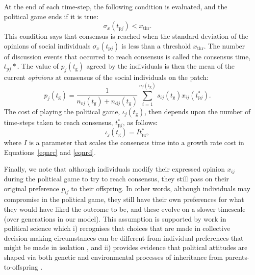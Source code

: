 \documentclass{rstb}
\begin{document}
\begin{linenumbers}
At the end of each time-step, the following condition is evaluated, and the political game ends if it is true:
\begin{equation}
    \sigma_x(t_{\mathrm{p}j}) < x_\mathrm{thr}.
    \label{eqnConsensus}
\end{equation}
This condition says that consensus is reached when the standard deviation of the opinions of social individuals $\sigma_x(t_{\mathrm{p}j})$ is less than a threshold $x_\mathrm{thr}$. The number of discussion events that occurred to reach consensus is called the consensus time, $t_{\mathrm{p}j}*$. The value of $p_j(t_\mathrm{g})$ agreed by the individuals is then the mean of the current \emph{opinions} at consensus of the social individuals on the patch:
\begin{equation}
    p_j(t_\mathrm{g}) = \frac{1}{n_{\mathrm{c}j}(t_\mathrm{g})+n_{\mathrm{d}j}(t_\mathrm{g})} \sum_{i=1}^{n_{j}(t_\mathrm{g})} s_{ij}(t_\mathrm{g})x_{ij}(t_{\mathrm{p}j}^*).
    \label{eqnFinalP}
\end{equation}
The cost of playing the political game, $\iota_j(t_\mathrm{g})$, then depends upon the number of time-steps taken to reach consensus, $t_{\mathrm{p}j}^*$, as follows:
\begin{equation}
    \iota_j(t_\mathrm{g}) = I t_{\mathrm{p}j}^*,
    \label{eqnInstCost}
\end{equation}
where $I$ is a parameter that scales the consensus time into a growth rate cost in Equations~\ref{eqnrc} and \ref{eqnrd}.

Finally, we note that although individuals modify their expressed opinion $x_{ij}$ during the political game to try to reach consensus, they still pass on their original preference $p_{ij}$ to their offspring. In other words, although individuals may compromise in the political game, they still have their own preferences for what they would have liked the outcome to be, and these evolve on a slower timescale (over generations in our model). This assumption is supported by work in political science which i) recognises that choices that are made in collective decision-making circumstances can be different from individual preferences that might be made in isolation \cite{Druckman:2000:a}, and ii) provides evidence that political attitudes are shaped via both genetic and environmental processes of inheritance from parents-to-offspring \cite{Hatemi:2009:a}.


\end{linenumbers}
\end{document}
